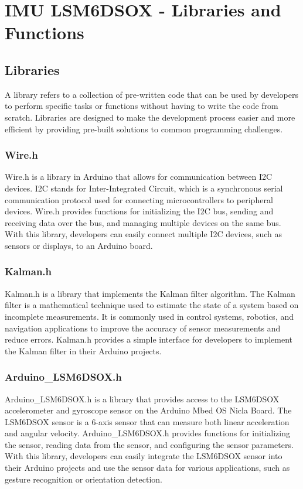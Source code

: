 %
%


\chapter{IMU LSM6DSOX - Libraries and Functions}  \label{Chap: Libraries and Functions}

\section{Libraries}

A library refers to a collection of pre-written code that can be used by developers to perform specific tasks or functions without having to write the code from scratch. Libraries are designed to make the development process easier and more efficient by providing pre-built solutions to common programming challenges.

\subsection{Wire.h}
Wire.h is a library in Arduino that allows for communication between I2C devices. I2C stands for Inter-Integrated Circuit, which is a synchronous serial communication protocol used for connecting microcontrollers to peripheral devices. Wire.h provides functions for initializing the I2C bus, sending and receiving data over the bus, and managing multiple devices on the same bus. With this library, developers can easily connect multiple I2C devices, such as sensors or displays, to an Arduino board.\cite{arduinoLCDI2C:2023,Aristi:2021}

\subsection{Kalman.h}
Kalman.h is a library that implements the Kalman filter algorithm. The Kalman filter is a mathematical technique used to estimate the state of a system based on incomplete measurements. It is commonly used in control systems, robotics, and navigation applications to improve the accuracy of sensor measurements and reduce errors. Kalman.h provides a simple interface for developers to implement the Kalman filter in their Arduino projects.\cite{arduino:2019Kalman,Fetick:2021}

\subsection{Arduino\_LSM6DSOX.h}
Arduino\_LSM6DSOX.h is a library that provides access to the LSM6DSOX accelerometer and gyroscope sensor on the Arduino Mbed OS Nicla Board. The LSM6DSOX sensor is a 6-axis sensor that can measure both linear acceleration and angular velocity. Arduino\_LSM6DSOX.h provides functions for initializing the sensor, reading data from the sensor, and configuring the sensor parameters. With this library, developers can easily integrate the LSM6DSOX sensor into their Arduino projects and use the sensor data for various applications, such as gesture recognition or orientation detection.\cite{arduino:2021lsm6dsox}

